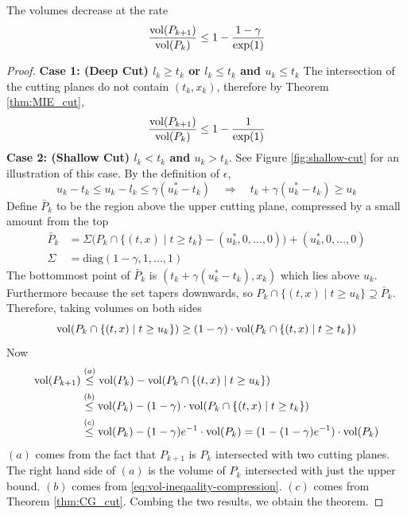 \begin{lem}\label{Rate-Decrease_cg}
The volumes decrease at the rate
\[
\frac{\textnormal{vol}(P_{k+1})}{\textnormal{vol}(P_k)}\leq  1-\frac{1-\gamma}{\exp(1)}
\]
\end{lem}
\begin{proof}

\noindent\textbf{Case 1: (Deep Cut) $l_k \geq t_k$ or $l_k \leq t_k$ and $u_k \leq t_k$ } 
The intersection of the cutting planes do not contain $(t_k,x_k)$, therefore by Theorem \ref{thm:MIE_cut},
\[
\frac{\textnormal{vol}(P_{k+1})}{\textnormal{vol}(P_k)}\leq 1 - \frac{1}{\exp(1)}
\]
\textbf{Case 2: (Shallow Cut) $l_k < t_k$ and $u_k > t_k$}. 
See Figure \ref{fig:shallow-cut} for an illustration of this case. 
By the definition of $\epsilon$,
\[
u_k-t_k \leq u_k-l_k\leq \gamma(u^*_k - t_k) \quad \Rightarrow \quad t_k + \gamma(u^*_k - t_k) \geq u_k 
\]
Define $\bar{P}_k$ to be the region above the upper cutting plane, compressed 
by a small amount from the top
\begin{align*}
\bar{P}_k & = \Sigma \big(P_{k}\cap\{(t,x)\mid t\geq t_{k}\} - (u^*_k, 0, \dots, 0) \big) + (u^*_k, 0, \dots, 0) \\
\Sigma & =\mbox{diag}(1-\gamma,1,\dots,1)
\end{align*}
The bottommost point of $\bar{P}_k$ is $(t_k+\gamma(u^*_k-t_k), x_k)$ which lies above $u_k$. Furthermore because the set tapers downwards, so $P_{k}\cap\{(t,x)\mid t\geq u_{k}\} \supseteq \bar{P}_k $. Therefore, taking volumes on both sides
\begin{equation} \label{eq:vol-ineqaality-compression}
\textnormal{vol}(P_k\cap\{(t,x)\mid t\geq u_{k}\})\geq (1-\gamma) \cdot \textnormal{vol}(P_k\cap\{(t,x)\mid t\geq t_{k}\})
\end{equation} 
Now
\begin{align*}
\textnormal{vol}(P_{k+1}) 
 & \overset{(a)}{\leq} \textnormal{vol}(P_k)-\textnormal{vol}(P_k\cap\{(t,x)\mid t\geq u_k\})\\
 & \overset{(b)}{\leq}\textnormal{vol}(P_k)-(1-\gamma)\cdot\textnormal{vol}(P_k\cap\{(t,x)\mid t\geq t_k\})\\
 & \overset{(c)}{\leq}\textnormal{vol}(P_k)-(1-\gamma) e^{-1}\cdot\textnormal{vol}(P_k) 
 = (1 - (1-\gamma)e^{-1} )\cdot \textnormal{vol}(P_k)
\end{align*}
$(a)$ comes from the fact that $P_{k+1}$ is $P_k$ intersected with two cutting planes. The right hand side of $(a)$ is the volume of $P_k$ intersected with just the upper bound. $(b)$ comes from \eqref{eq:vol-ineqaality-compression}. $(c)$ comes from Theorem \ref{thm:CG_cut}. Combing the two results, we obtain the theorem. 
\end{proof}

